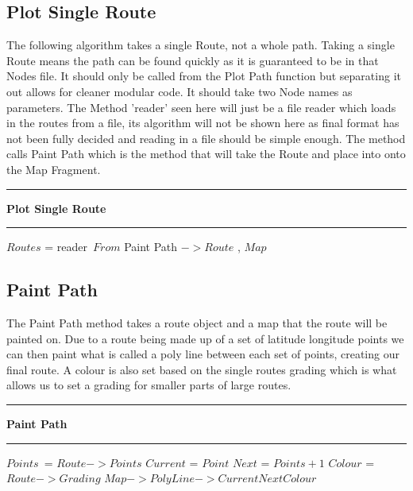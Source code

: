 \subsection{Plot Single Route}
The following algorithm takes a single Route, not a whole path. Taking a single Route means the path can be found quickly as it is guaranteed to be in that Nodes file. It should only be called from the Plot Path function but separating it out allows for cleaner modular code. It should take two Node names as parameters. The Method 'reader' seen here will just be a file reader which loads in the routes from a file, its algorithm will not be shown here as final format has not been fully decided and reading in a file should be simple enough. The method calls Paint Path which is the method that will take the Route and place into onto the Map Fragment.
\vspace{0.3cm}
\hrule
\vspace{0.2cm}
\textbf{Plot Single Route}
\vspace{0.1cm}
\hrule
\vspace{0.1cm}
\begin{algorithmic}[1]
\State $Routes$ = reader\ $From$
		\State Paint Path  $-> Route$ , $Map$
	\EndIf
\EndFor

\end{algorithmic}
\subsection{Paint Path}
The Paint Path method takes a route object and a map that the route will be painted on. Due to a route being made up of a set of latitude longitude points we can then paint what is called a poly line between each set of points, creating our final route. A colour is also set based on the single routes grading which is what allows us to set a grading for smaller parts of large routes. 
\vspace{0.3cm}
\hrule
\vspace{0.2cm}
\textbf{Paint Path}
\vspace{0.1cm}
\hrule
\vspace{0.1cm}
\begin{algorithmic}[1]
\State $Points$\ = $Route -> Points$
	\State $Current$ = $Point$
		\State $Next$ = $Points + 1$
		\State $Colour$ = $Route -> Grading$
		\State $Map -> Poly Line -> Current  Next Colour$
		
	\EndIf
\EndFor
\end{algorithmic}
\newpage
